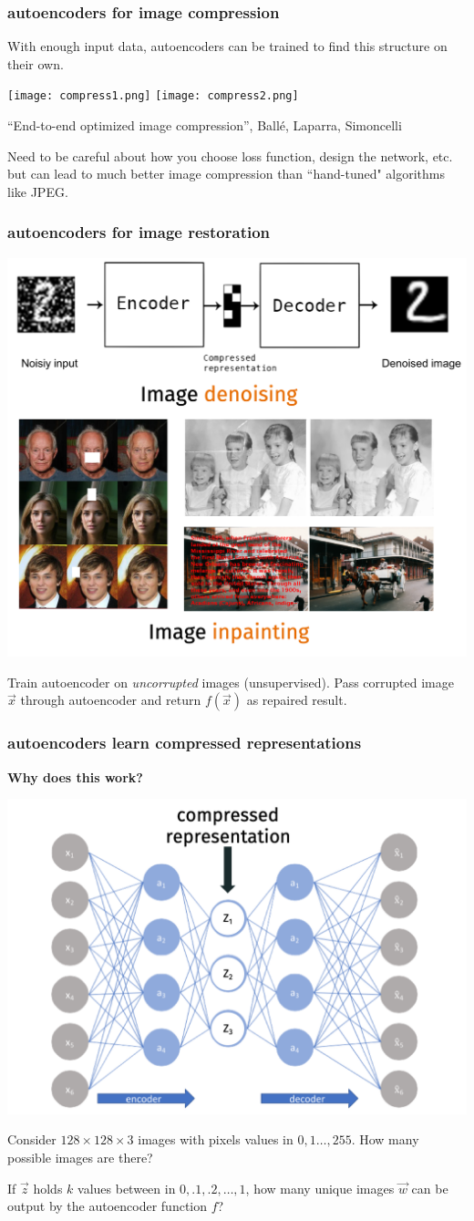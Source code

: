 \documentclass[handout,compress]{beamer}
\begin{document}
\begin{frame}
	\frametitle{autoencoders for image compression}
	\small
	With enough input data, autoencoders can be trained to find this structure on their own.
	\begin{center}
		\texttt{[image: compress1.png]}\hspace{2em} \texttt{[image: compress2.png]}
		
		\tiny{``End-to-end optimized image compression'', Ball\'{e}, Laparra, Simoncelli}
	\end{center}
	 Need to be careful about how you choose loss function, design the network, etc. but can lead to much better image compression than ``hand-tuned" algorithms like JPEG.
\end{frame}

\begin{frame}
	\frametitle{autoencoders for image restoration}
	\small
	\begin{center}
		\includegraphics*[width=.6\textwidth]{resto.png}
	\end{center}
\vspace{-1.5em}
	Train autoencoder on \emph{uncorrupted} images (unsupervised). Pass corrupted image $\vec{x}$ through autoencoder and return $f(\vec{x})$ as repaired result.
\end{frame}

\begin{frame}
	\frametitle{autoencoders learn compressed representations}
	\begin{center}
	\textbf{Why does this work?}
	
	\includegraphics[width=.5\textwidth]{compressed_rep.png}
	\end{center}
Consider $128\times 128 \times 3$ images with pixels values in $0, 1 \ldots, 255$. How many possible images are there?\vspace{.5em}
	
If $\vec{z}$ holds $k$ values between in $0,.1,.2,\ldots, 1$, how many unique images $\vec{w}$ can be output by the autoencoder function $f$?
\end{frame}
\end{document}
